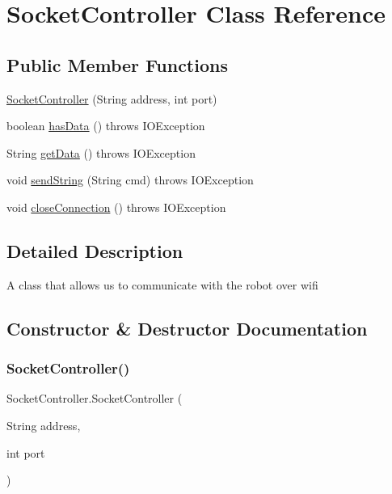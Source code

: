 \hypertarget{class_socket_controller}{}\section{Socket\+Controller Class Reference}
\label{class_socket_controller}
\subsection*{Public Member Functions}
\begin{DoxyCompactItemize}
\item 
\mbox{\hyperlink{class_socket_controller_a3a812b4563cf1cff149f247e9d5677a3}{Socket\+Controller}} (String address, int port)
\item 
boolean \mbox{\hyperlink{class_socket_controller_a7de8ef4fc180b2ed9e32b0dea6eb88f3}{has\+Data}} ()  throws I\+O\+Exception 
\item 
String \mbox{\hyperlink{class_socket_controller_a73e0c51679b713a6ff6a265b003e5794}{get\+Data}} ()  throws I\+O\+Exception 
\item 
void \mbox{\hyperlink{class_socket_controller_ab4e8320da2db8f611a402ca668785c29}{send\+String}} (String cmd)  throws I\+O\+Exception 
\item 
void \mbox{\hyperlink{class_socket_controller_ad7ce6469961880bd7564c54eac4f43ec}{close\+Connection}} ()  throws I\+O\+Exception 
\end{DoxyCompactItemize}


\subsection{Detailed Description}
A class that allows us to communicate with the robot over wifi 

\subsection{Constructor \& Destructor Documentation}
\mbox{\label{class_socket_controller_a3a812b4563cf1cff149f247e9d5677a3}} 
\subsubsection{\texorpdfstring{Socket\+Controller()}{SocketController()}}
{\footnotesize\ttfamily Socket\+Controller.\+Socket\+Controller (\begin{DoxyParamCaption}\item[{String}]{address,  }\item[{int}]{port }\end{DoxyParamCaption})\hspace{0.3cm}{\ttfamily [inline]}}

